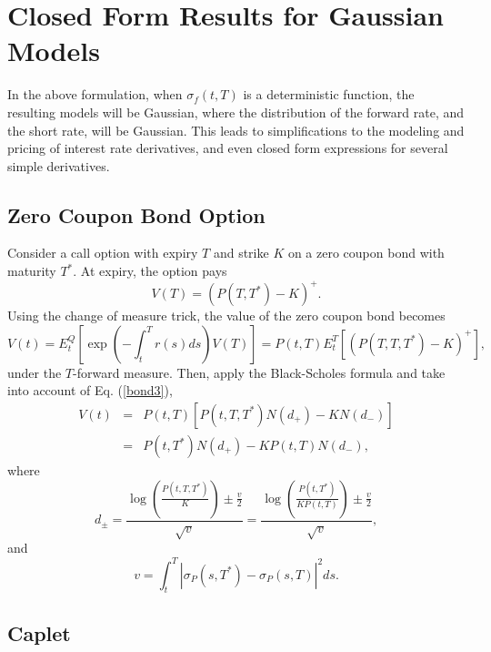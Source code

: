 \documentclass[12pt]{article}
\begin{document}
\section{Closed Form Results for Gaussian Models}

  In the above formulation, when $\sigma_f(t,T)$ is a deterministic function,
  the resulting models will be Gaussian, where the distribution of the forward rate, and the short rate, will be Gaussian.
  This leads to simplifications to the modeling and pricing of interest rate derivatives, and even closed form expressions
  for several simple derivatives.
    
  \subsection{Zero Coupon Bond Option}
  
    Consider a call option with expiry $T$ and strike $K$ on a zero coupon bond with maturity $T^*$. At expiry, the
    option pays
    \begin{equation}
      V(T)=\left(P(T,T^*)-K\right)^+.
    \end{equation}
    Using the change of measure trick, the value of the zero coupon bond becomes
    \begin{equation}
      V(t)=E_t^Q\left[\exp\left(-\int_t^Tr(s)ds\right)V(T)\right]=P(t,T)E_t^T\left[\left(P(T,T,T^*)-K\right)^+\right],
    \end{equation}
    under the $T$-forward measure. Then, apply the Black-Scholes formula and take into account of Eq. (\ref{bond3}),
    \begin{eqnarray}
      V(t) &=& P(t,T)\left[P(t,T,T^*)N(d_+)-KN(d_-)\right] \nonumber\\
           &=& P(t,T^*)N(d_+) - KP(t,T)N(d_-),
      \label{zcbo}
    \end{eqnarray}
    where
    \begin{equation}
      d_{\pm} = \frac{\displaystyle\log\left(\frac{P(t,T,T^*)}{K}\right)\pm \frac{v}{2}}{\sqrt{v}}
             = \frac{\displaystyle\log\left(\frac{P(t,T^*)}{KP(t,T)}\right)\pm \frac{v}{2}}{\sqrt{v}},
    \end{equation}
    and
    \begin{equation}
      v=\int_t^T\left|\sigma_P(s,T^*)-\sigma_P(s,T)\right|^2ds.
    \end{equation}
  
  \subsection{Caplet}
  
\end{document}
